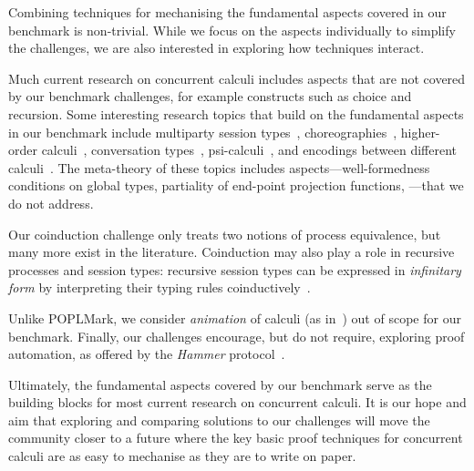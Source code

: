\documentclass[runningheads]{llncs}
\begin{document}
Combining techniques for mechanising the fundamental aspects covered in our benchmark is non-trivial.
While we focus on the aspects individually to simplify the challenges, we are also interested in exploring how techniques interact.

Much current research on concurrent calculi includes aspects that are
not covered by our benchmark challenges, for example constructs such as
choice and recursion.
Some interesting research topics that build on the
fundamental aspects in our benchmark include multiparty session
types~\cite{10.1145/2827695}, choreographies~\cite{Carbone2013},
higher-order calculi~\cite{Hirsch2022}, conversation
types~\cite{DBLP:journals/tcs/CairesV10}, psi-calculi~\cite{lmcs:696},
and encodings between different
calculi~\cite{DBLP:journals/iandc/Gorla10,DBLP:journals/iandc/DardhaGS17}.
The meta-theory of these topics includes aspects---\eg well-formedness conditions on
global types, partiality of end-point projection functions,
\etc---that we do not address.

Our coinduction challenge only treats two notions of process equivalence, but many more exist in the literature.
Coinduction may also play a role in recursive processes and session types: recursive session types can be expressed in \emph{infinitary form} by interpreting their typing rules coinductively~\cite{DerakhshanPfenning22,HornePadovani23}.

Unlike POPLMark, we consider \emph{animation} of calculi (as in~\cite{Castro-Perez2021}) out of scope for our benchmark.
Finally, our challenges encourage, but do not require, exploring proof automation, as offered by \eg the \emph{Hammer} protocol~\cite{BohmeN10,CzajkaK18}.

Ultimately, the fundamental aspects covered by our benchmark serve as the building blocks for most current research on concurrent calculi.
It is our hope and aim that exploring and comparing solutions to our challenges will move the community closer to a future where the key basic proof techniques for concurrent calculi are as easy to mechanise as they are to write on paper.
\end{document}
